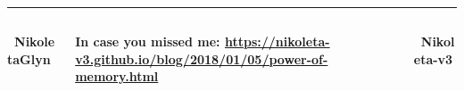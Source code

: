 \documentclass[usenames,dvipsnames,t]{beamer}
\begin{document}
\begin{columns}
\begin{column}{.33\linewidth}
    \vspace{1cm}
\end{column}
\end{columns}

\vspace{1cm}

\hrule height 3pt
\begin{columns}
    \begin{column}{.2\linewidth}
        \vspace{0.3cm}

        \centering
        \textbf{ \faTwitter \ NikoletaGlyn}
    \end{column}
    \begin{column}{.6\linewidth}
        \vspace{0.3cm}

        \centering
        \textbf{ In case you missed me: \url{https://nikoleta-v3.github.io/blog/2018/01/05/power-of-memory.html}}
    \end{column}
    \begin{column}{.2\linewidth}
        \vspace{0.3cm}

        \centering
        \textbf{ \faGithub \ Nikoleta-v3}
    \end{column}
\end{columns}
\end{document}
